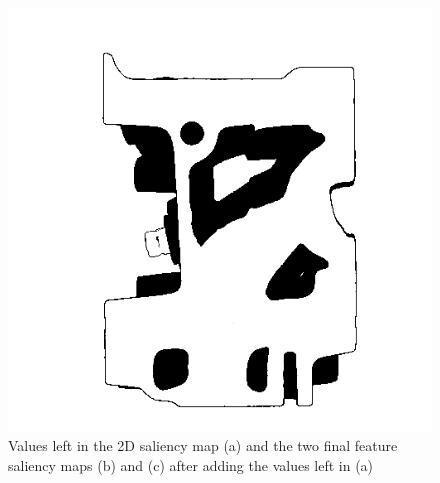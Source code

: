 \begin{figure}
\begin{minipage}{.33\textwidth}
		\subcaption{}
	\end{minipage}~
	\begin{minipage}{.33\textwidth}
		\includegraphics[width=1\linewidth]{images/engine_naive_saliencemap_2}
		\subcaption{}
	\end{minipage}
	\caption{Values left in the 2D saliency map (a) and the two final feature saliency maps (b) and (c) after adding the values left in (a)}
	\label{fig:engine_naive_saliencemap_features}
\end{figure}

